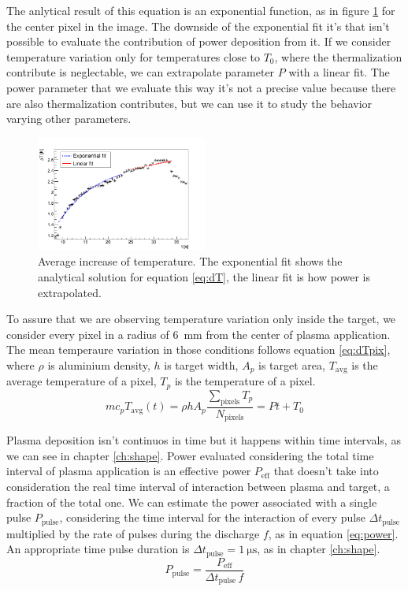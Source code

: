 The anlytical result of this equation is an exponential function, as in figure \ref{fig:dTfit} for the center pixel in the image. The downside of the exponential fit it's that isn't possible to evaluate the contribution of power deposition from it. If we consider temperature variation only for temperatures close to $T_{0}$, where the thermalization contribute is neglectable, we can extrapolate parameter $P$ with a linear fit. The power parameter that we evaluate this way it's not a precise value because there are also thermalization contributes, but we can use it to study the behavior varying other parameters.
\begin{figure}
 \centering
 \includegraphics[width=0.5\textwidth]{Images/Temperature/f5t4d4_fits.png}
 \caption{Average increase of temperature. The exponential fit shows the analytical solution for equation \ref{eq:dT}, the linear fit is how power is extrapolated.}
 \label{fig:dTfit}
\end{figure}


To assure that we are observing temperature variation only inside the target, we consider every pixel in a radius of \SI{6}{\milli\meter} from the center of plasma application. The mean temperaure variation in those conditions follows equation \ref{eq:dTpix}, where $\rho$ is aluminium density, $h$ is target width, $A_p$ is target area, $T_{\text{avg}}$ is the average temperature of a pixel, $T_p$ is the temperature of a pixel.
\begin{equation}
 m c_{p} T_{\text{avg}}(t) = \rho h A_{p}\frac{\sum_{\text{pixels}} T_{p}}{N_{\text{pixels}}} = P t + T_{0}
 \label{eq:dTpix}
\end{equation}


Plasma deposition isn't continuos in time but it happens within time intervals, as we can see in chapter \ref{ch:shape}.
Power evaluated considering the total time interval of plasma application is an effective power $P_{\text{eff}}$ that doesn't take into consideration the real time interval of interaction between plasma and target, a fraction of the total one. We can estimate the power associated with a single pulse $P_{\text{pulse}}$, considering the time interval for the interaction of every pulse $\Delta t_{\text{pulse}}$ multiplied by the rate of pulses during the discharge $f$, as in equation \ref{eq:power}. An appropriate time pulse duration is $\Delta t_{\text{pulse}} = \SI{1}{\micro\second}$, as in chapter \ref{ch:shape}.
\begin{equation}
 P_{\text{pulse}} = \frac{P_{\text{eff}}}{\Delta t_{\text{pulse}} \, f}
 \label{eq:power}
\end{equation}


